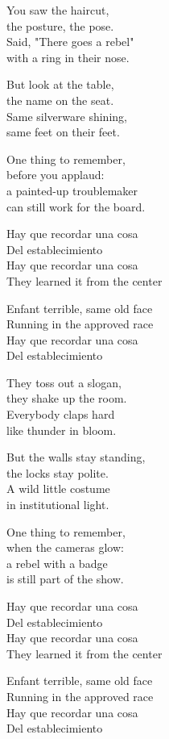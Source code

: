 \begin{lyrics}
You saw the haircut,\\
the posture, the pose.\\
Said, "There goes a rebel"\\
with a ring in their nose.

But look at the table,\\
the name on the seat.\\
Same silverware shining,\\
same feet on their feet.

One thing to remember,\\
before you applaud:\\
a painted-up troublemaker\\
can still work for the board.

Hay que recordar una cosa\\
Del establecimiento\\
Hay que recordar una cosa\\
They learned it from the center

Enfant terrible, same old face\\
Running in the approved race\\
Hay que recordar una cosa\\
Del establecimiento

They toss out a slogan,\\
they shake up the room.\\
Everybody claps hard\\
like thunder in bloom.

But the walls stay standing,\\
the locks stay polite.\\
A wild little costume\\
in institutional light.

One thing to remember,\\
when the cameras glow:\\
a rebel with a badge\\
is still part of the show.

Hay que recordar una cosa\\
Del establecimiento\\
Hay que recordar una cosa\\
They learned it from the center

Enfant terrible, same old face\\
Running in the approved race\\
Hay que recordar una cosa\\
Del establecimiento


\end{lyrics}
